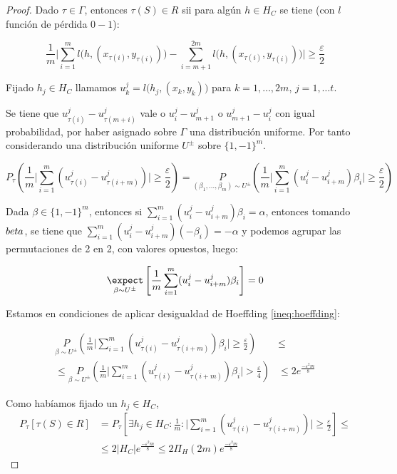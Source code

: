\begin{proof}
  Dado $\tau \in \Gamma$, entonces $\tau(S) \in R$ sii para algún $h\in H_C$ se tiene (con $l$ función de pérdida $0-1$):

  \[\frac{1}{m} \bigg|\sum_{i=1}^m l\big(h,(x_{\tau(i)}, y_{\tau(i)}) \big) - 
    \sum_{i=m+1}^{2m} l\big(h,(x_{\tau(i)}, y_{\tau(i)})\big) \bigg| \ge \frac{\varepsilon}{2}\]
    
    
  Fijado $h_j \in H_C$ llamamos $u_k^j = l \big(h_j, (x_k,y_k) \big)$ para $k=1, \ldots, 2m$, $j=1, \ldots t$.

  Se tiene que $u_{\tau(i)}^j - u_{\tau(m+i)}^j$ vale o $u_i^j - u_{m+1}^j$ o $u_{m+1}^j - u_i^j$ con igual probabilidad,
  por haber asignado sobre $\Gamma$ una distribución uniforme. Por tanto considerando una distribución uniforme $U^{\pm}$ 
  sobre $\{1,-1\}^m$.

  \[P_{\tau} \left(\frac{1}{m} \bigg|\sum_{i=1}^m (u_{\tau(i)}^j - u_{\tau(i+m)}^j) \bigg| \ge \frac{\varepsilon}{2} \right) = 
    \underset{(\beta_1, \ldots, \beta_m) \sim U^{\pm}}{P} \left(\frac{1}{m} \bigg|\sum_{i=1}^m (u_i^j - u_{i+m}^j)\beta_i \bigg| \ge 
    \frac{\varepsilon}{2} \right)\]
    
  Dada $\beta \in \{1,-1\}^m$, entonces si $\sum_{i=1}^m (u_i^j - u_{i+m}^j)\beta_i = \alpha$, entonces tomando $\-beta$,
  se tiene que $\sum_{i=1}^m (u_i^j - u_{i+m}^j)(-\beta_i) = -\alpha$ y podemos agrupar las permutaciones de 2 en 2,
  con valores opuestos, luego:

  \[\underset{\beta \sim U^{\pm}}{\expect} \left[\frac{1}{m}\sum_{i=1}^m (u_i^j - u_{i+m}^j)\beta_i \right] = 0\]

  Estamos en condiciones de aplicar desigualdad de Hoeffding \ref{ineq:hoeffding}:

  \begin{align*}
    \underset{\beta \sim U^{\pm}}{P} \left(\frac{1}{m} \bigg|\sum_{i=1}^m (u_{\tau(i)}^j - u_{\tau(i+m)}^j)\beta_i \bigg| \ge 
    \frac{\varepsilon}{2} \right) &\le \\
    \le \underset{\beta \sim U^{\pm}}{P} \left(\frac{1}{m} \bigg|\sum_{i=1}^m (u_{\tau(i)}^j - u_{\tau(i+m)}^j)\beta_i \bigg| > 
    \frac{\varepsilon}{4} \right) &\le 2e^{\frac{-\varepsilon^2m}{8}}
  \end{align*}

  Como habíamos fijado un $h_j\in H_C$, 
  \begin{align*}
  P_{\tau} [\tau(S) \in R] &= P_{\tau} \left[\exists h_j \in H_C: \frac{1}{m} : 
  \bigg|\sum_{i=1}^m (u_{\tau(i)}^j - u_{\tau(i+m)}^j) \bigg| \ge \frac{\varepsilon}{2} \right] \le \\
  &\le 2 |H_C| e^{\frac{-\varepsilon^2 m}{8}} \le 2\Pi_H(2m) e^{\frac{-\varepsilon^2 m}{8}}
  \end{align*}


\end{proof}
